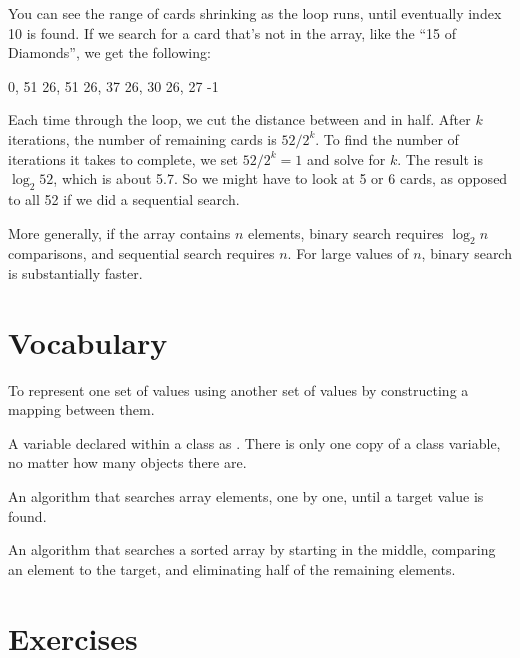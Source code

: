 You can see the range of cards shrinking as the  loop runs, until eventually index 10 is found.
If we search for a card that's not in the array, like  the ``15 of Diamonds'', we get the following:

\begin{stdout}
0, 51
26, 51
26, 37
26, 30
26, 27
-1
\end{stdout}

%

Each time through the loop, we cut the distance between  and  in half.
After $k$ iterations, the number of remaining cards is $52 / 2^k$.
To find the number of iterations it takes to complete, we set $52 / 2^k = 1$ and solve for $k$.
The result is $\log_2 52$, which is about 5.7.
So we might have to look at 5 or 6 cards, as opposed to all 52 if we did a sequential search.

More generally, if the array contains $n$ elements, binary search requires $\log_2 n$ comparisons, and sequential search requires $n$.
For large values of $n$, binary search is substantially faster.


\section{Vocabulary}

\begin{description}

To represent one set of values using another set of values by constructing a mapping between them.

A variable declared within a class as .
There is only one copy of a class variable, no matter how many objects there are.

An algorithm that searches array elements, one by one, until a target value is found.

An algorithm that searches a sorted array by starting in the middle, comparing an element to the target, and eliminating half of the remaining elements.

\end{description}


\section{Exercises}

